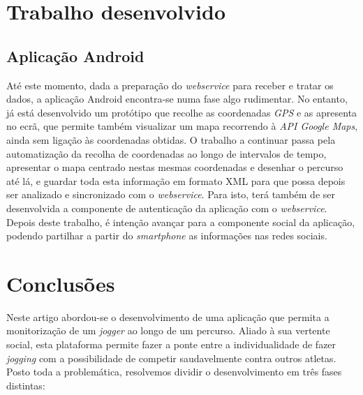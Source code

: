 \documentclass[twocolumn,twoside,10pt,a4paper]{article}
\begin{document}
\section{Trabalho desenvolvido}\label{sec:trabalhodesenvolvido}

\subsection{Aplicação Android}

Até este momento, dada a preparação do  \textit{webservice} para receber e tratar os dados, a aplicação Android encontra-se numa fase algo rudimentar. No entanto, já está desenvolvido um protótipo que recolhe as coordenadas  \textit{GPS} e as apresenta no ecrã, que permite também visualizar um mapa recorrendo à \emph{API Google Maps}, ainda sem ligação às coordenadas obtidas.
O trabalho a continuar passa pela automatização da recolha de coordenadas ao longo de intervalos de tempo, apresentar o mapa centrado nestas mesmas coordenadas e desenhar o percurso até lá, e guardar toda esta informação em formato XML para que possa depois ser analizado e sincronizado com o  \textit{webservice}. Para isto, terá também de ser desenvolvida a componente de autenticação da aplicação com o  \textit{webservice}.
Depois deste trabalho, é intenção avançar para a componente social da aplicação, podendo partilhar a partir do  \textit{smartphone} as informações nas redes sociais.


\section{Conclusões}\label{sec:conclusions}

Neste artigo abordou-se o desenvolvimento de uma aplicação que permita a monitorização de um \textit{jogger} ao longo de um percurso. Aliado à sua vertente social, esta plataforma permite fazer a ponte entre a individualidade de fazer \textit{jogging} com a possibilidade de competir saudavelmente contra outros atletas.
Posto toda a problemática, resolvemos dividir o desenvolvimento em três fases distintas:
\end{document}
